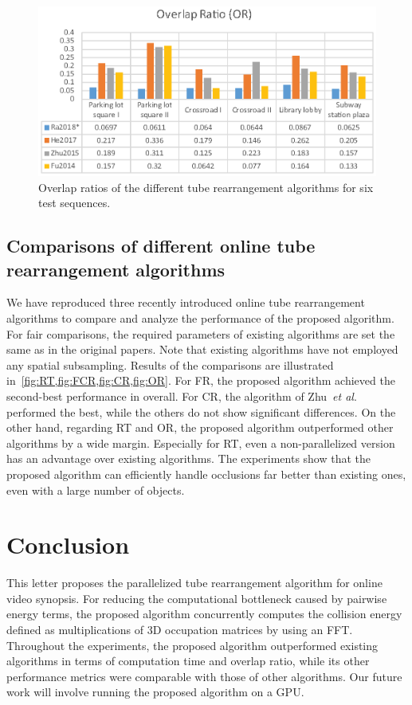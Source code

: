 \documentclass[11pt]{hyu_thesis}
\newcommand{\etal}{\textit{et al}.}
\begin{document}
\begin{figure}[t]
\begin{center}
\includegraphics[width=0.9\linewidth]{OR.eps}
\end{center}
   \caption{Overlap ratios of the different tube rearrangement algorithms for six test sequences.}
\label{fig:OR}
\end{figure}

\subsection{Comparisons of different online tube rearrangement algorithms}
We have reproduced three recently introduced online tube rearrangement algorithms to compare and analyze the performance of the proposed algorithm. For fair comparisons, the required parameters of existing algorithms are set the same as in the original papers. Note that existing algorithms have not employed any spatial subsampling. Results of the comparisons are illustrated in~\cref{fig:RT,fig:FCR,fig:CR,fig:OR}. For FR, the proposed algorithm achieved the second-best performance in overall. For CR, the algorithm of Zhu~\etal~\cite{JianqingZhu2015} performed the best, while the others do not show significant differences. On the other hand, regarding RT and OR, the proposed algorithm outperformed other algorithms by a wide margin. Especially for RT, even a non-parallelized version has an advantage over existing algorithms. The experiments show that the proposed algorithm can efficiently handle occlusions far better than existing ones, even with a large number of objects.

\section{Conclusion}
\label{sec:conc}
This letter proposes the parallelized tube rearrangement algorithm for online video synopsis. For reducing the computational bottleneck caused by pairwise energy terms, the proposed algorithm concurrently computes the collision energy defined as multiplications of 3D occupation matrices by using an FFT. Throughout the experiments, the proposed algorithm outperformed existing algorithms in terms of computation time and overlap ratio, while its other performance metrics were comparable with those of other algorithms. Our future work will involve running the proposed algorithm on a GPU.



\end{document}
